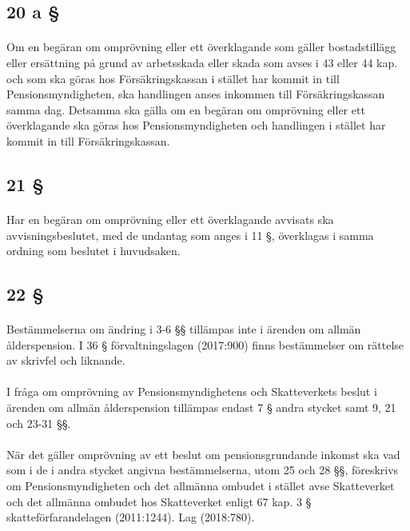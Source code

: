\documentclass[a4paper,notitlepage,openany,10pt]{book}
\begin{document}
\subsection*{20 a §}
\paragraph*{}
Om en begäran om omprövning eller ett överklagande som gäller bostadstillägg eller ersättning på grund av arbetsskada eller skada som avses i 43 eller 44 kap. och som ska göras hos Försäkringskassan i stället har kommit in till Pensionsmyndigheten, ska handlingen anses inkommen till Försäkringskassan samma dag. Detsamma ska gälla om en begäran om omprövning eller ett överklagande ska göras hos Pensionsmyndigheten och handlingen i stället har kommit in till Försäkringskassan.
\subsection*{21 §}
\paragraph*{}
Har en begäran om omprövning eller ett överklagande avvisats ska avvisningsbeslutet, med de undantag som anges i 11 §, överklagas i samma ordning som beslutet i huvudsaken.
\subsection*{22 §}
\paragraph*{}
Bestämmelserna om ändring i 3-6 §§ tillämpas inte i ärenden om allmän ålderspension. I 36 § förvaltningslagen (2017:900) finns bestämmelser om rättelse av skrivfel och liknande.
\paragraph*{}
I fråga om omprövning av Pensionsmyndighetens och Skatteverkets beslut i ärenden om allmän ålderspension tillämpas endast 7 § andra stycket samt 9, 21 och 23-31 §§.
\paragraph*{}
När det gäller omprövning av ett beslut om pensionsgrundande inkomst ska vad som i de i andra stycket angivna bestämmelserna, utom 25 och 28 §§, föreskrivs om Pensionsmyndigheten och det allmänna ombudet i stället avse Skatteverket och det allmänna ombudet hos Skatteverket enligt 67 kap. 3 § skatteförfarandelagen (2011:1244).
Lag (2018:780).
\end{document}
